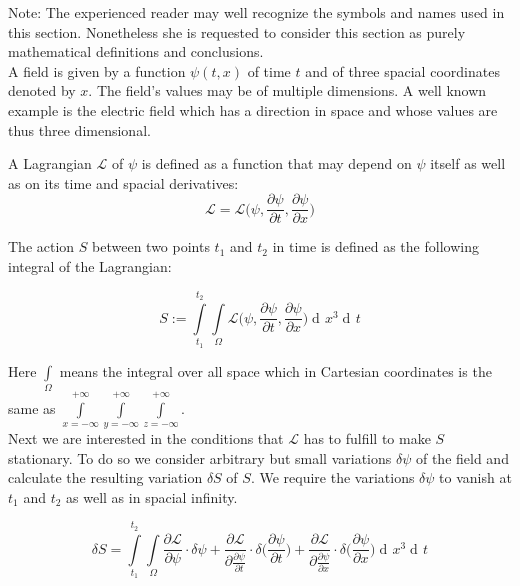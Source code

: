 \documentclass{article}
\DeclareMathOperator{\dd}{d\!}
\begin{document}
Note: The experienced reader may well recognize the symbols and names used in this section. Nonetheless she is requested to consider this section as purely mathematical definitions and conclusions. \\

A field is given by a function $\psi(t,x)$ of time $t$ and of three spacial coordinates denoted by $x$. The field's values may be of multiple dimensions. A well known example is the electric field which has a direction in space and whose values are thus three dimensional.

A Lagrangian $\mathcal{L}$ of $\psi$ is defined as a function that may depend on $\psi$ itself as well as on its time and spacial derivatives: 
\begin{equation}
\mathcal{L} = \mathcal{L}\bigg(\psi, \frac{\partial \psi}{\partial t}, \frac{\partial \psi}{\partial x}\bigg)
\end{equation}

The action $S$ between two points $t_1$ and $t_2$ in time is defined as the following integral of the Lagrangian:

\begin{equation}
S := \int\limits_{t_1}^{t_2} \int\limits_{\Omega} \mathcal{L}\bigg(\psi, \frac{\partial \psi}{\partial t}, \frac{\partial \psi}{\partial x}\bigg) \dd x^3 \dd t
\end{equation}

Here $\int\limits_{\Omega}$ means the integral over all space which in Cartesian coordinates is the same as  $\int\limits_{x=-\infty}^{+\infty}\int\limits_{y=-\infty}^{+\infty}\int\limits_{z=-\infty}^{+\infty}$.\\


Next we are interested in the conditions that $\mathcal{L}$ has to fulfill to make $S$ stationary. To do so we consider arbitrary but small variations $\delta\psi$ of the field and calculate the resulting variation $\delta S$ of $S$. We require the variations $\delta\psi$ to vanish at $t_1$ and $t_2$ as well as in spacial infinity.

\begin{equation}
\delta S = \int\limits_{t_1}^{t_2} \int\limits_{\Omega} 
\frac{\partial \mathcal{L}}{\partial \psi} \cdot \delta \psi
+ \frac{\partial \mathcal{L}}{\partial \frac{\partial \psi}{\partial t}} \cdot \delta \bigg(\frac{\partial \psi} {\partial t}\bigg)
+ \frac{\partial \mathcal{L}}{\partial \frac{\partial \psi}{\partial x}} \cdot \delta \bigg(\frac{\partial \psi} {\partial x}\bigg)
\dd x^3 \dd t
\end{equation}
\end{document}
